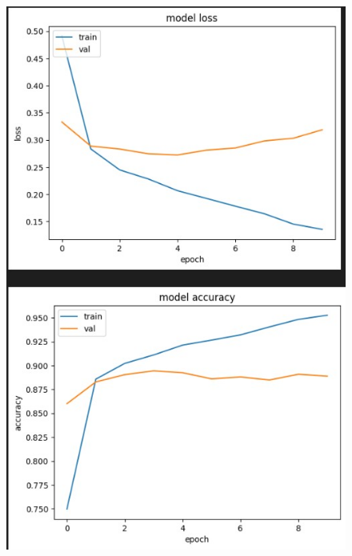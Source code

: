 \documentclass{article}
\begin{document}
\begin{figure}[!h]
    \centering\includegraphics[scale=.65]{./GRU-[16, 16]-[64, 16, 16]}
    \caption{}\label{fig.411}
\end{figure}
\end{document}
